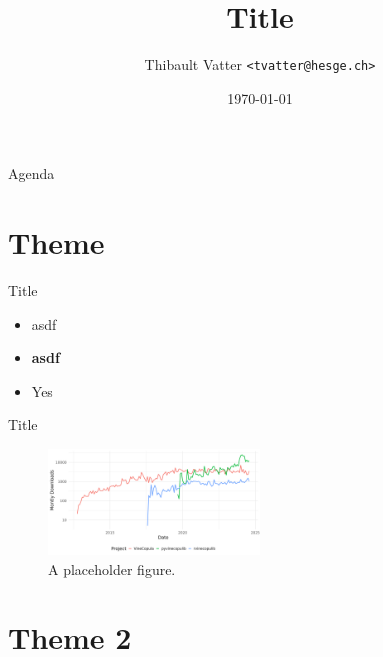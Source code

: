 \documentclass[11pt]{beamer}
\title{Title}
\institute{University of Applied Sciences Western Switzerland}
\date{\today}
\author[T.~Vatter]{Thibault Vatter \texttt{<tvatter@hesge.ch>}}
\begin{document}

{ %
\begin{frame}[noframenumbering] 
	\titlepage
\end{frame}
}


\begin{frame}{Agenda}
	\tableofcontents
\end{frame}


\section{Theme}


\begin{frame}{Title}

	\begin{itemize}
		\item asdf  
		\item  \textbf{asdf}  
		\item[\cmark] Yes
	\end{itemize}
\end{frame}

\begin{frame}{Title}

  \citep{vatter2015generalized}

  \begin{figure}[h]
    \centering
    \includegraphics[width=0.5\textwidth]{figures/popularity_vine_software.png}
    \caption{A placeholder figure.}
    \label{fig:placeholder}
  \end{figure}

\end{frame}


\section{Theme 2}
\end{document}
